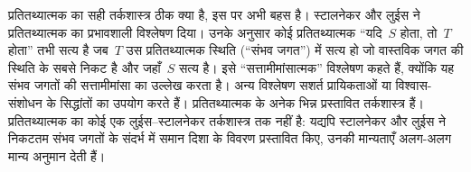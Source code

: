 \documentclass[../../../include/open-logic-section]{subfiles}
\begin{document}
प्रतितथ्यात्मक का सही तर्कशास्त्र ठीक क्या है, इस पर अभी बहस है। स्टालनेकर
और लुईस ने प्रतितथ्यात्मक का प्रभावशाली विश्लेषण दिया। उनके अनुसार कोई
प्रतितथ्यात्मक ``यदि~$S$ होता, तो~$T$ होता'' तभी सत्य है जब~$T$ उस
प्रतितथ्यात्मक स्थिति (``संभव जगत'') में सत्य हो जो वास्तविक जगत की स्थिति
के सबसे निकट है और जहाँ~$S$ सत्य है। इसे ``सत्तामीमांसात्मक'' विश्लेषण कहते
हैं, क्योंकि यह संभव जगतों की सत्तामीमांसा का उल्लेख करता है। अन्य विश्लेषण
सशर्त प्रायिकताओं या विश्वास-संशोधन के सिद्धांतों का उपयोग करते हैं।
प्रतितथ्यात्मक के अनेक भिन्न प्रस्तावित तर्कशास्त्र हैं। प्रतितथ्यात्मक का
कोई एक लुईस--स्टालनेकर तर्कशास्त्र तक नहीं है: यद्यपि स्टालनेकर और लुईस ने
निकटतम संभव जगतों के संदर्भ में समान दिशा के विवरण प्रस्तावित किए, उनकी
मान्यताएँ अलग-अलग मान्य अनुमान देती हैं।
\end{document}

